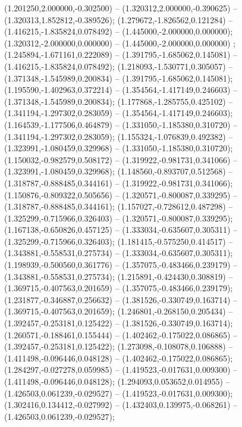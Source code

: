  (1.201250,2.000000,-0.302500) -- (1.320312,2.000000,-0.390625) -- (1.320313,1.852812,-0.389526);
 (1.279672,-1.826562,0.121284) -- (1.416215,-1.835824,0.078492) -- (1.445000,-2.000000,0.000000);
 (1.320312,-2.000000,0.000000) -- (1.445000,-2.000000,0.000000) ;
 (1.245894,-1.671161,0.222089) -- (1.391795,-1.685062,0.145081) -- (1.416215,-1.835824,0.078492);
 (1.218093,-1.530771,0.305057) -- (1.371348,-1.545989,0.200834) -- (1.391795,-1.685062,0.145081);
 (1.195590,-1.402963,0.372214) -- (1.354564,-1.417149,0.246603) -- (1.371348,-1.545989,0.200834);
 (1.177868,-1.285755,0.425102) -- (1.341194,-1.297302,0.283059) -- (1.354564,-1.417149,0.246603);
 (1.164539,-1.177506,0.464879) -- (1.331050,-1.185380,0.310720) -- (1.341194,-1.297302,0.283059);
 (1.155324,-1.076839,0.492382) -- (1.323991,-1.080459,0.329968) -- (1.331050,-1.185380,0.310720);
 (1.150032,-0.982579,0.508172) -- (1.319922,-0.981731,0.341066) -- (1.323991,-1.080459,0.329968);
 (1.148560,-0.893707,0.512568) -- (1.318787,-0.888485,0.344161) -- (1.319922,-0.981731,0.341066);
 (1.150876,-0.809322,0.505656) -- (1.320571,-0.800087,0.339295) -- (1.318787,-0.888485,0.344161);
 (1.157027,-0.728612,0.487298) -- (1.325299,-0.715966,0.326403) -- (1.320571,-0.800087,0.339295);
 (1.167138,-0.650826,0.457125) -- (1.333034,-0.635607,0.305311) -- (1.325299,-0.715966,0.326403);
 (1.181415,-0.575250,0.414517) -- (1.343881,-0.558531,0.275734) -- (1.333034,-0.635607,0.305311);
 (1.198939,-0.500560,0.361776) -- (1.357075,-0.483466,0.239179) -- (1.343881,-0.558531,0.275734);
 (1.215891,-0.424430,0.308819) -- (1.369715,-0.407563,0.201659) -- (1.357075,-0.483466,0.239179);
 (1.231877,-0.346887,0.256632) -- (1.381526,-0.330749,0.163714) -- (1.369715,-0.407563,0.201659);
 (1.246801,-0.268150,0.205434) -- (1.392457,-0.253181,0.125422) -- (1.381526,-0.330749,0.163714);
 (1.260571,-0.188461,0.155444) -- (1.402462,-0.175022,0.086865) -- (1.392457,-0.253181,0.125422);
 (1.273098,-0.108078,0.106888) -- (1.411498,-0.096446,0.048128) -- (1.402462,-0.175022,0.086865);
 (1.284297,-0.027278,0.059985) -- (1.419523,-0.017631,0.009300) -- (1.411498,-0.096446,0.048128);
 (1.294093,0.053652,0.014955) -- (1.426503,0.061239,-0.029527) -- (1.419523,-0.017631,0.009300);
 (1.302416,0.134412,-0.027992) -- (1.432403,0.139975,-0.068261) -- (1.426503,0.061239,-0.029527);

